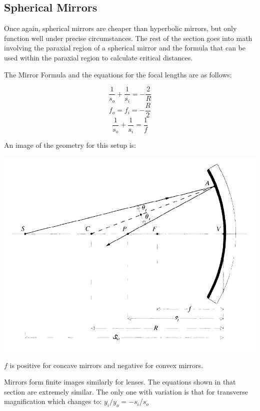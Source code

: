\documentclass[12pt]{report}
\begin{document}
\subsection{Spherical Mirrors}
Once again, spherical mirrors are cheaper than hyperbolic mirrors, but only function well under precise circumstances. The rest of the section goes into math involving the paraxial region of a spherical mirror and the formula that can be used within the paraxial region to calculate critical distances.

The Mirror Formula and the equations for the focal lengths are as follows:

\begin{equation}
\frac{1}{s_o}+\frac{1}{s_i} = -\frac{2}{R}
\end{equation}
\begin{equation}
f_o = f_i = -\frac{R}{2} 
\end{equation}
\begin{equation}
\frac{1}{s_o}+\frac{1}{s_i} = \frac{1}{f}
\end{equation}


An image of the geometry for this setup is:

\includegraphics[scale=.5]{SphericalMirror.jpg}

$f$ is positive for concave mirrors and negative for convex mirrors. 

Mirrors form finite images similarly for lenses. The equations shown in that section are extremely similar. The only one with variation is that for transverse magnification which changes to: $y_i/y_o=-s_i/s_o$
\end{document}
